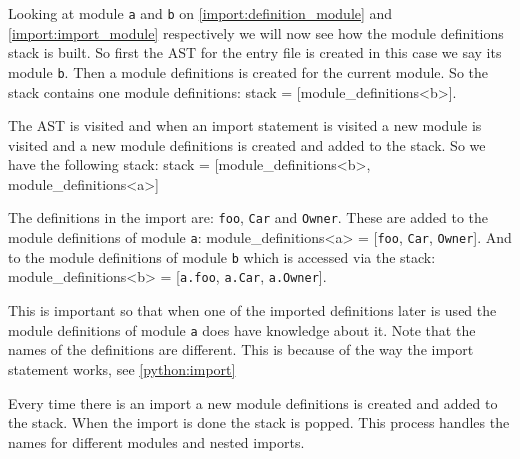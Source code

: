 
Looking at module \texttt{a} and \texttt{b} on \cref{import:definition_module} and \cref{import:import_module} respectively we will now see how the module definitions stack is built.
So first the AST for the entry file is created in this case we say its module \texttt{b}.
Then a module definitions is created for the current module.
So the stack contains one module definitions: stack = [module\_definitions<b>].

The AST is visited and when an import statement is visited a new module is visited and a new module definitions is created and added to the stack.
So we have the following stack: stack = [module\_definitions<b>, module\_definitions<a>]

The definitions in the import are: \texttt{foo}, \texttt{Car} and \texttt{Owner}.
These are added to the module definitions of module \texttt{a}: module\_definitions<a> = [\texttt{foo}, \texttt{Car}, \texttt{Owner}].
And to the  module definitions of module \texttt{b} which is accessed via the stack:  module\_definitions<b> = [\texttt{a.foo}, \texttt{a.Car}, \texttt{a.Owner}].

This is important so that when one of the imported definitions later is used the module definitions of module \texttt{a} does have knowledge about it.
Note that the names of the definitions are different.
This is because of the way the import statement works, see \cref{python:import}

Every time there is an import a new module definitions is created and added to the stack.
When the import is done the stack is popped.
This process handles the names for different modules and nested imports.
